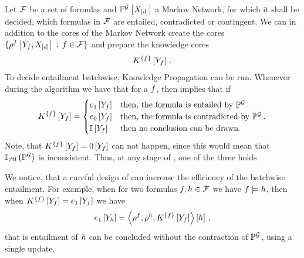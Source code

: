 \begin{example}
	Let $\mathcal{F}$ be a set of formulas and $\mathbb{P}^{\mathcal{G}}\left[X_{[d]}\right]$ a Markov Network, for which it shall be decided, which formulas in $\mathcal{F}$ are entailed, contradicted or contingent.
	We can in addition to the cores of the Markov Network create the cores $\{\rho^{f}\left[Y_{f},X_{[d]}\right] \, : \, f\in\mathcal{F}\}$ and prepare the knowledge cores
	\begin{align*}
		K^{\{f\}}\left[Y_{f}\right] \, .
	\end{align*}
	To decide entailment batchwise, Knowledge Propagation  can be run.
	Whenever during the algorithm we have that for a $f$, then  implies that if
	\begin{align*}
		K^{\{f\}}\left[Y_{f}\right] =
		\begin{cases}
			e_1\left[Y_{f}\right] & \text{then, the formula is entailed by }\mathbb{P}^{\mathcal{G}} \, . \\
			e_0\left[Y_{f}\right] & \text{then, the formula is contradicted by }\mathbb{P}^{\mathcal{G}} \, .\\
			\mathbb{I}\left[Y_{f}\right] & \text{then no conclusion can be drawn.}
	\end{cases}
	\end{align*}
	Note, that $K^{\{f\}}\left[Y_{f}\right] = 0\left[Y_{f}\right]$ can not happen, since this would mean that $\mathbb{I}_{\neq0}\left(\mathbb{P}^{\mathcal{G}}\right)$ is inconsistent.
	Thus, at any stage of , one of the three holds.

	We notice, that a careful design of  can increase the efficiency of the batchwise entailment.
	For example, when for two formulas $f,h\in\mathcal{F}$ we have $f\models h$, then when $K^{\{f\}}\left[Y_{f}\right] = e_1\left[Y_{f}\right]$ we have
	\begin{align*}
		e_1\left[Y_{h}\right] = \left\langle \rho^{f},\rho^{h},K^{\{f\}}\left[Y_{f}\right]\right\rangle \left[ h \right] \, ,
	\end{align*}
	that is entailment of $h$ can be concluded without the contraction of $\mathbb{P}^{\mathcal{G}}$, using a single update.

\end{example}

